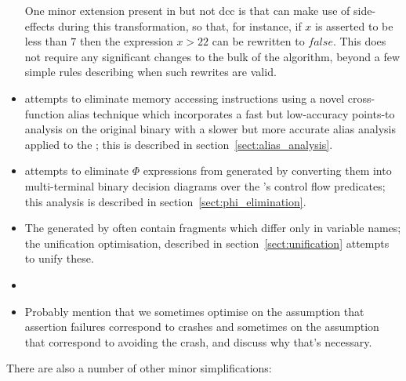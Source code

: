 \begin{itemize}
  One minor extension present in {\implementation} but not dcc is that
  {\implementation} can make use of  side-effects during
  this transformation, so that, for instance, if $x$ is asserted to be
  less than $7$ then the expression $x > 22$ can be rewritten to
  $false$.  This does not require any significant changes to the bulk
  of the algorithm, beyond a few simple rules describing when such
  rewrites are valid.  
\item
  {\Technique} attempts to eliminate memory accessing instructions
  using a novel cross-function alias technique which incorporates a
  fast but low-accuracy points-to analysis on the original binary with
  a slower but more accurate alias analysis applied to the
  {\StateMachine}; this is described in
  section~\ref{sect:alias_analysis}.
\item
  {\Technique} attempts to eliminate $\Phi$ expressions from generated
  {\StateMachines} by converting them into multi-terminal binary
  decision diagrams over the {\StateMachine}'s control flow predicates;
  this analysis is described in section~\ref{sect:phi_elimination}.
\item
  The {\StateMachines} generated by {\technique} often contain
  fragments which differ only in variable names; the unification
  optimisation, described in section~\ref{sect:unification} attempts
  to unify these.
\item
\item
  Probably mention that we sometimes optimise on the assumption that
  assertion failures correspond to crashes and sometimes on the
  assumption that correspond to avoiding the crash, and discuss why
  that's necessary.
\end{itemize}

There are also a number of other minor simplifications:

